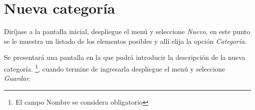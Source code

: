 \section{Nueva categor\'ia}
\label{sec:nuevaCategoria}
Dir\'ijase a la pantalla inicial, despliegue el men\'u \blackberry y seleccione
\emph{Nuevo}, en este punto se le muestra un listado de los elementos posibles y
all\'i elija la opci\'on \emph{Categor\'ia}.

Se presentar\'a una pantalla en la que podr\'a introducir la descripci\'on de la
nueva categor\'ia.
\footnote{El campo Nombre se considera obligatorio},
cuando termine de ingresarla despliegue el men\'u \blackberry y seleccione
\emph{Guardar}.